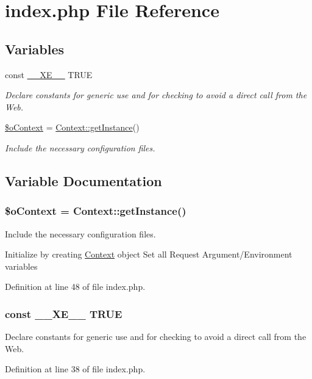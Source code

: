 \hypertarget{index_8php}{\section{index.\+php File Reference}
\label{index_8php}
}
\subsection*{Variables}
\begin{DoxyCompactItemize}
\item 
const \hyperlink{index_8php_a697de427d83b791899ae45d555377756}{\+\_\+\+\_\+\+X\+E\+\_\+\+\_\+} T\+R\+U\+E
\begin{DoxyCompactList}\small\item\em Declare constants for generic use and for checking to avoid a direct call from the Web. \end{DoxyCompactList}\item 
\hyperlink{index_8php_aacfc569bef069a536ba65859b245068b}{\$o\+Context} = \hyperlink{classContext_a399e419617c7fe9b0c9eaf22c431df69}{Context\+::get\+Instance}()
\begin{DoxyCompactList}\small\item\em Include the necessary configuration files. \end{DoxyCompactList}\end{DoxyCompactItemize}


\subsection{Variable Documentation}
\hypertarget{index_8php_aacfc569bef069a536ba65859b245068b}{
\subsubsection[{\$o\+Context}]{\setlength{\rightskip}{0pt plus 5cm}\$o\+Context = {\bf Context\+::get\+Instance}()}}\label{index_8php_aacfc569bef069a536ba65859b245068b}


Include the necessary configuration files. 

Initialize by creating \hyperlink{classContext}{Context} object Set all Request Argument/\+Environment variables 

Definition at line 48 of file index.\+php.

\hypertarget{index_8php_a697de427d83b791899ae45d555377756}{
\subsubsection[{\+\_\+\+\_\+\+X\+E\+\_\+\+\_\+}]{\setlength{\rightskip}{0pt plus 5cm}const \+\_\+\+\_\+\+X\+E\+\_\+\+\_\+ T\+R\+U\+E}}\label{index_8php_a697de427d83b791899ae45d555377756}


Declare constants for generic use and for checking to avoid a direct call from the Web. 



Definition at line 38 of file index.\+php.

